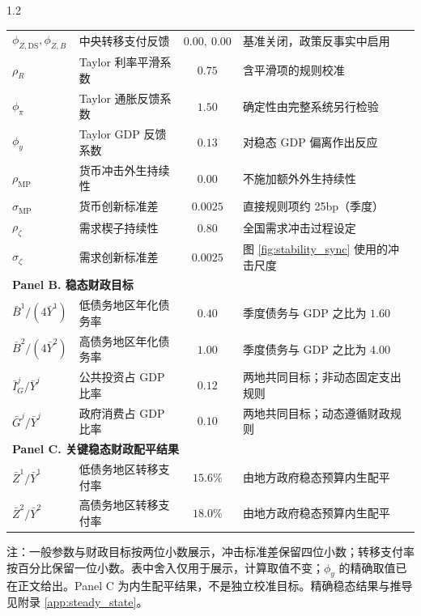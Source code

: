 \documentclass[12pt,UTF8]{ctexart}
\newcommand{\DS}{\mathrm{DS}}
\newcommand{\MP}{\mathrm{MP}}
\begin{document}
\begin{spacing}{1.2}
\begin{table}[H]
\begin{tabular}{p{}p{}cp{}}
				$\phi_{Z,\DS},\phi_{Z,B}$ & 中央转移支付反馈 & $0.00,\ 0.00$ & 基准关闭，政策反事实中启用 \\
				$\rho_R$ & Taylor 利率平滑系数 & $0.75$ & 含平滑项的规则校准\cite{wangxi2017} \\
				$\phi_\pi$ & Taylor 通胀反馈系数 & $1.50$ & 确定性由完整系统另行检验 \\
				$\phi_y$ & Taylor GDP 反馈系数 & $0.13$ & 对稳态 GDP 偏离作出反应 \\
				$\rho_{\MP}$ & 货币冲击外生持续性 & $0.00$ & 不施加额外外生持续性 \\
				$\sigma_{\MP}$ & 货币创新标准差 & $0.0025$ & 直接规则项约 25bp（季度） \\
				$\rho_\zeta$ & 需求楔子持续性 & $0.80$ & 全国需求冲击过程设定 \\
				$\sigma_\zeta$ & 需求创新标准差 & $0.0025$ & 图 \ref{fig:stability_sync} 使用的冲击尺度 \\
				\midrule
				\multicolumn{4}{l}{\textbf{Panel B. 稳态财政目标}} \\
				$\bar B^1/(4\bar Y^1)$ & 低债务地区年化债务率 & $0.40$ & 季度债务与 GDP 之比为 $1.60$ \\
				$\bar B^2/(4\bar Y^2)$ & 高债务地区年化债务率 & $1.00$ & 季度债务与 GDP 之比为 $4.00$ \\
				$\bar I_G^j/\bar Y^j$ & 公共投资占 GDP 比率 & $0.12$ & 两地共同目标；非动态固定支出规则 \\
				$\bar G^j/\bar Y^j$ & 政府消费占 GDP 比率 & $0.10$ & 两地共同目标；动态遵循财政规则 \\
				\midrule
				\multicolumn{4}{l}{\textbf{Panel C. 关键稳态财政配平结果}} \\
				$\bar Z^1/\bar Y^1$ & 低债务地区转移支付率 & $15.6\%$ & 由地方政府稳态预算内生配平 \\
				$\bar Z^2/\bar Y^2$ & 高债务地区转移支付率 & $18.0\%$ & 由地方政府稳态预算内生配平 \\
				\bottomrule
			\end{tabular}
			\par\smallskip
			\begin{minipage}{\textwidth}
				\footnotesize 注：一般参数与财政目标按两位小数展示，冲击标准差保留四位小数；转移支付率按百分比保留一位小数。表中舍入仅用于展示，计算取值不变；$\phi_y$ 的精确取值已在正文给出。Panel C 为内生配平结果，不是独立校准目标。精确稳态结果与推导见附录 \ref{app:steady_state}。
			\end{minipage}
		\end{table}
		

\end{spacing}
\end{document}
